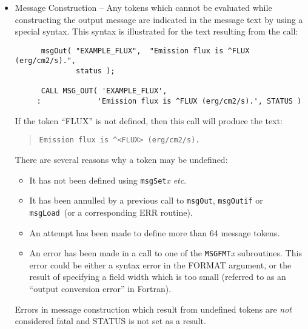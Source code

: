 \documentclass[twoside,11pt]{article}
\renewcommand{\_}{\texttt{\symbol{95}}}
\newcommand{\func}[1]{\texttt{#1}}
\newcommand{\msgload}{\func{msgLoad}}
\newcommand{\msgout}{\func{msgOut}}
\newcommand{\msgoutif}{\func{msgOutif}}
\begin{document}
\begin {itemize}
\item Message Construction -- Any tokens which cannot be evaluated while
constructing the output message are indicated in the message text by using a
special syntax. 
This syntax is illustrated for the text resulting from the call:

\begin {small}
\begin{verbatim}
      msgOut( "EXAMPLE_FLUX",  "Emission flux is ^FLUX (erg/cm2/s).",
              status ); 

      CALL MSG_OUT( 'EXAMPLE_FLUX', 
     :             'Emission flux is ^FLUX (erg/cm2/s).', STATUS )
\end{verbatim}
\end {small}

If the token ``FLUX'' is not defined, then this call will produce the text:

\begin {quote}
\begin {small}
\begin{verbatim}
Emission flux is ^<FLUX> (erg/cm2/s).
\end{verbatim}
\end {small}
\end {quote}

There are several reasons why a token may be undefined:

\begin {itemize}
\item It has not been defined using \func{msgSet}\textit{x} \textit{etc}.

\item It has been annulled by a previous call to \msgout, \msgoutif
or \msgload\ (or a corresponding ERR routine).

\item An attempt has been made to define more than 64 message tokens.

\item An error has been made in a call to one of the \func{MSG\_FMT}\textit{x} 
subroutines. 
This error could be either a syntax error in the FORMAT argument, or the
result of specifying a field width which is too small (referred to 
as an ``output conversion error'' in Fortran). 
\end {itemize}

Errors in message construction which result from undefined tokens are \emph{not}
considered fatal and STATUS is not set as a result.


\end{itemize}
\end{document}
